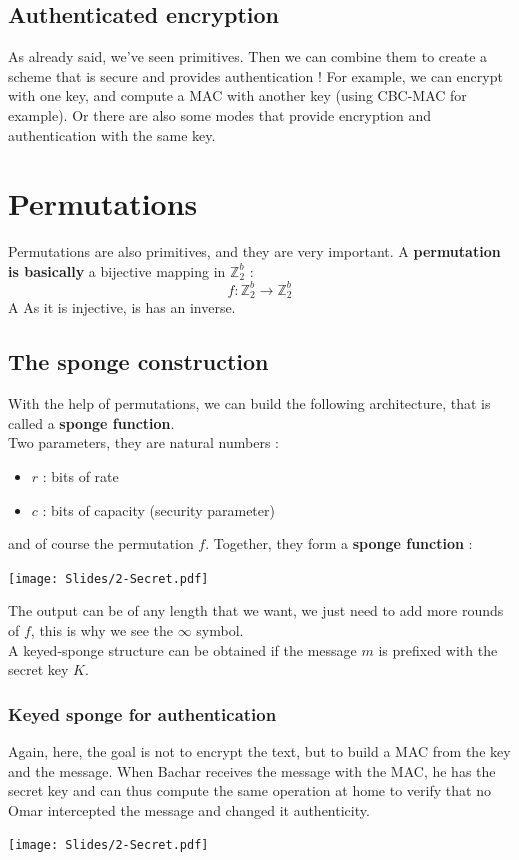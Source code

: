 \documentclass[../Cryptography.tex]{subfiles}
\begin{document}
\subsection{Authenticated encryption}
As already said, we've seen primitives. Then we can combine them to create a scheme that is secure and provides authentication ! For example, we can encrypt with one key, and compute a MAC with another key (using CBC-MAC for example). Or there are also some modes that provide encryption and authentication with the same key.


\section{Permutations}
Permutations are also primitives, and they are very important. A \textbf{permutation is basically} a bijective mapping in $\mathbb{Z}_2 ^b$ :
$$f : \mathbb{Z}_2 ^b \rightarrow \mathbb{Z}_2 ^b$$A
As it is injective, is has an inverse. 

\subsection{The sponge construction}
With the help of permutations, we can build the following architecture, that is called a \textbf{sponge function}. \\

Two parameters, they are natural numbers : 
\begin{itemize}
    \item $r$ : bits of rate 
    \item $c$ : bits of capacity (security parameter)
\end{itemize}
and of course the permutation $f$. Together, they form a \textbf{sponge function} :
\begin{center}
    \texttt{[image: Slides/2-Secret.pdf]}
\end{center}
The output can be of any length that we want, we just need to add more rounds of $f$, this is why we see the $\infty$ symbol. \\

A keyed-sponge structure can be obtained if the message $m$ is prefixed with the secret key $K$.

\subsubsection{Keyed sponge for authentication}
Again, here, the goal is not to encrypt the text, but to build a MAC from the key and the message. When Bachar receives the message with the MAC, he has the secret key and can thus compute the same operation at home to verify that no Omar intercepted the message and changed it authenticity.
\begin{center}
    \texttt{[image: Slides/2-Secret.pdf]}
\end{center}
\end{document}
